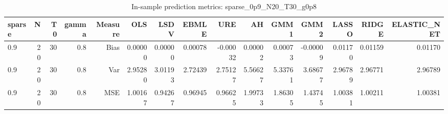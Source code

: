 \begin{table}[!htbp]\centering
\caption{In-sample prediction metrics: sparse_0p9_N20_T30_g0p8}
\label{tab:table2_sparse_0p9_N20_T30_g0p8}
\begin{tabular}{lrrrrrrrrrrrrrr}
\hline
sparse & N & T0 & gamma & Measure & OLS & LSDV & EBMLE & URE & AH & GMM1 & GMM2 & LASSO & RIDGE & ELASTIC_NET \\
\hline
0.9 & 20 & 30 & 0.8 & Bias & 0.00000 & 0.00000 & 0.00078 & -0.00032 & 0.00002 & 0.00073 & -0.00009 & 0.01170 & 0.01159 & 0.01170 \\
0.9 & 20 & 30 & 0.8 & Var & 2.95280 & 3.01193 & 2.72439 & 2.75127 & 5.56627 & 5.33761 & 3.68677 & 2.96789 & 2.96771 & 2.96789 \\
0.9 & 20 & 30 & 0.8 & MSE & 1.00167 & 0.94267 & 0.96945 & 0.96625 & 1.99733 & 1.86305 & 1.43745 & 1.00381 & 1.00211 & 1.00381 \\
\hline
\end{tabular}
\end{table}

